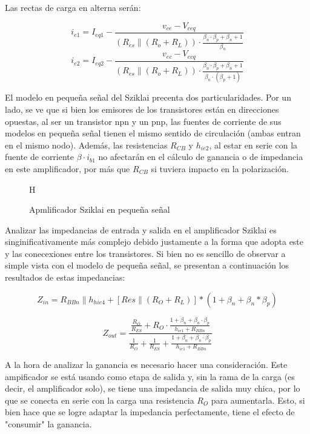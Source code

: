Las rectas de carga en alterna serán: 

\begin{equation}
    i_{e1} = I_{eq1} - \frac{v_{ce}-V_{ceq}}{(R_{es}\parallel (R_o+R_L))\cdot \frac{\beta_n\cdot\beta_p + \beta_n+1}{\beta_n}}
    \label{Car_aNSz}
\end{equation}
\begin{equation}
    i_{e2} = I_{eq2} - \frac{v_{ec}-V_{ecq}}{(R_{es}\parallel (R_o+R_L))\cdot \frac{\beta_n\cdot\beta_p + \beta_n+1}{\beta_n\cdot(\beta_p+1)}}
    \label{Car_aPSz}
\end{equation}

El modelo en pequeña señal del Sziklai precenta dos particularidades. Por un lado, se ve que si bien los emisores de los transistores están en direcciones opuestas, al ser un transistor npn y un pnp, las fuentes de corriente de sus modelos en pequeña señal tienen el mismo sentido de circulación (ambas entran en el mismo nodo). Además, las resistencias $R_{CB}$ y $h_{ie2}$, al estar en serie con la fuente de corriente $\beta\cdot i_{b1}$ no afectarán en el cálculo de ganancia o de impedancia en este amplificador, por más que $R_{CB}$ si tuviera impacto en la polarización.

\begin{figure}{H}
    \centering
    
    \caption{Apmlificador Sziklai en pequeña señal}
    \label{fig:SzPS}
\end{figure}

Analizar las impedancias de entrada y salida en el amplificador Sziklai es singinificativamente más complejo debido justamente a la forma que adopta este y las conecexiones entre los transistores. Si bien no es sencillo de observar a simple vista con el modelo de pequeña señal, se presentan a continuación los resultados de estas impedancias:

\begin{equation}
  Z_{in} = R_{BBn} \parallel {h_{hie4} + [Res\parallel(R_O+R_L)]*(1+\beta_n+\beta_n*\beta_p)}
  \label{ZinSz}
\end{equation}

\begin{equation}
  Z_{out} = \frac{\frac{R_O}{R_{ES}} + R_O\cdot \frac{1+\beta_n+\beta_n\cdot\beta_p}{h_{ie1}+R_{BBn}}}{\frac{1}{R_O}+\frac{1}{R_{ES}} + \frac{1+\beta_n+\beta_n\cdot\beta_p}{h_{ie1}+R_{BBn}}}
  \label{ZoSz}
\end{equation}

A la hora de analizar la ganancia es necesario hacer una consideración. Este ampificador se está usando como etapa de salida y, sin la rama de la carga (es decir, el amplificador solo), se tiene una impedancia de salida muy chica, por lo que se conecta en serie con la carga una resistencia $R_O$ para aumentarla. Esto, si bien hace que se logre adaptar la impedancia perfectamente, tiene el efecto de "consumir" la ganancia.

